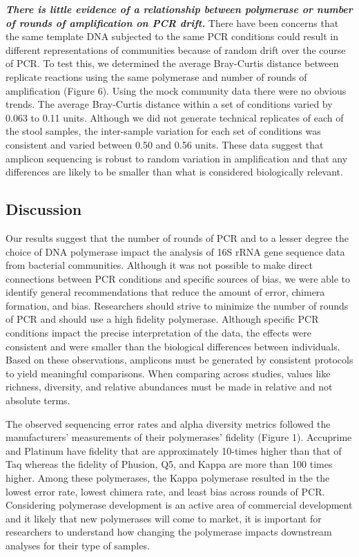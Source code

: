 \documentclass[11pt,]{article}
\begin{document}
\textbf{\emph{There is little evidence of a relationship between
polymerase or number of rounds of amplification on PCR drift.}} There
have been concerns that the same template DNA subjected to the same PCR
conditions could result in different representations of communities
because of random drift over the course of PCR. To test this, we
determined the average Bray-Curtis distance between replicate reactions
using the same polymerase and number of rounds of amplification (Figure
6). Using the mock community data there were no obvious trends. The
average Bray-Curtis distance within a set of conditions varied by 0.063
to 0.11 units. Although we did not generate technical replicates of each
of the stool samples, the inter-sample variation for each set of
conditions was consistent and varied between 0.50 and 0.56 units. These
data suggest that amplicon sequencing is robust to random variation in
amplification and that any differences are likely to be smaller than
what is considered biologically relevant.

\newpage

\hypertarget{discussion}{%
\subsection{Discussion}\label{discussion}}

Our results suggest that the number of rounds of PCR and to a lesser
degree the choice of DNA polymerase impact the analysis of 16S rRNA gene
sequence data from bacterial communities. Although it was not possible
to make direct connections between PCR conditions and specific sources
of bias, we were able to identify general recommendations that reduce
the amount of error, chimera formation, and bias. Researchers should
strive to minimize the number of rounds of PCR and should use a high
fidelity polymerase. Although specific PCR conditions impact the precise
interpretation of the data, the effects were consistent and were smaller
than the biological differences between individuals. Based on these
observations, amplicons must be generated by consistent protocols to
yield meaningful comparisons. When comparing across studies, values like
richness, diversity, and relative abundances must be made in relative
and not absolute terms.

The observed sequencing error rates and alpha diversity metrics followed
the manufacturers' measurements of their polymerases' fidelity (Figure
1). Accuprime and Platinum have fidelity that are approximately 10-times
higher than that of Taq whereas the fidelity of Phusion, Q5, and Kappa
are more than 100 times higher. Among these polymerases, the Kappa
polymerase resulted in the the lowest error rate, lowest chimera rate,
and least bias across rounds of PCR. Considering polymerase development
is an active area of commercial development and it likely that new
polymerases will come to market, it is important for researchers to
understand how changing the polymerase impacts downstream analyses for
their type of samples.
\end{document}
